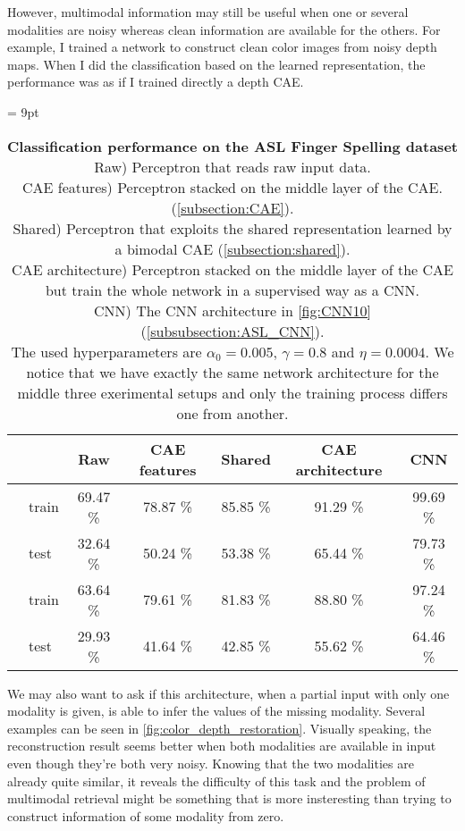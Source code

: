 However, multimodal information may still be useful when one or several
modalities are noisy whereas clean information are available for the others.
For example, I trained a network to construct clean color images from
noisy depth maps. When I did the classification based on the learned
representation, the performance was as if I trained directly a depth CAE.

\begin{table}[H]
  \tabcolsep = 9pt
  \caption{\textbf{Classification performance on the ASL Finger Spelling
    dataset}\\[0.1em]
    Raw) Perceptron that reads raw input data.\\[0.1em]
    CAE features) Perceptron stacked on the middle layer of the CAE.
      (\ref{subsection:CAE}).\\[0.1em]
    Shared) Perceptron that exploits the shared representation learned
      by a bimodal CAE (\ref{subsection:shared}).\\[0.1em]
    CAE architecture) Perceptron stacked on the middle layer of the CAE
      but train the whole network in a supervised way as a CNN.\\[0.1em]
    CNN) The CNN architecture in \autoref{fig:CNN10}
      (\ref{subsubsection:ASL_CNN}). \\[0.1em]
    The used hyperparameters are $\alpha_0=0.005$, $\gamma=0.8$ and
    $\eta=0.0004$. We notice that we have exactly the same network
    architecture for the middle three exerimental setups and only the
    training process differs one from another.
    }
  \label{tab:ASL_classif}
  \begin{tabular*}{\linewidth}{>{\bf}llccccc}
    \toprule
    && Raw & CAE features & Shared & CAE architecture & CNN\\
    \midrule
    \multirow{2}{*}{Intensity} &
    train & 69.47 \% & 78.87 \% & 85.85 \% & 91.29 \% & 99.69 \% \\
    & test & 32.64 \% & 50.24 \% & 53.38 \% & 65.44 \% & 79.73 \% \\
    \midrule
    \multirow{2}{*}{Depth} &
    train & 63.64 \% & 79.61 \% & 81.83 \% & 88.80 \% & 97.24 \% \\
    & test & 29.93 \% & 41.64 \% & 42.85 \% & 55.62 \% & 64.46 \% \\
    \bottomrule
  \end{tabular*}
\end{table}

We may also want to ask if this architecture, when a partial input with
only one modality is given, is able to infer the values of the missing
modality.
Several examples can be seen in \autoref{fig:color_depth_restoration}.
Visually speaking, the reconstruction result seems better when
both modalities are available in input even though they're both very noisy.
Knowing that the two modalities are already quite similar, it reveals
the difficulty of this task and the problem of multimodal retrieval
might be something that is more insteresting than trying to construct
information of some modality from zero.

